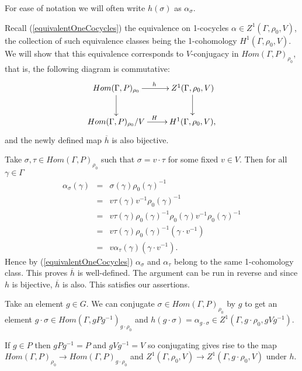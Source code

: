 For ease of notation we will often write $h(\sigma)$ as $\alpha_\sigma$.

Recall (\ref{equivalentOneCocycles}) the equivalence on 1-cocycles $\alpha\in Z^1(\Gamma, \rho_0, V)$, the collection of such equivalence classes being the 1-cohomology $H^1(\Gamma, \rho_0, V)$. We will show that this equivalence corresponds to $V$-conjugacy in $Hom(\Gamma, P)_{\rho_0}$, that is, the following diagram is commutative:
\begin{displaymath}
	\xymatrix{
		Hom(\Gamma, P)_{\rho_0} \ar[r]^h \ar[d] & Z^1(\Gamma, \rho_0, V)\ar[d] \\
		Hom(\Gamma, P)_{\rho_0}/V \ar[r]^{H} & H^1(\Gamma, \rho_0, V),
	}
\end{displaymath}
and the newly defined map $\overline{h}$ is also bijective.

Take $\sigma,\tau\in Hom(\Gamma, P)_{\rho_0}$ such that $\sigma = v\cdot\tau$ for some fixed $v\in V$. Then for all $\gamma\in \Gamma$
\begin{eqnarray*}
	\alpha_\sigma(\gamma) &=& \sigma(\gamma)\rho_0(\gamma)^{-1}\\
	&=& v\tau(\gamma)v^{-1}\rho_0(\gamma)^{-1}\\
	&=& v\tau(\gamma)\rho_0(\gamma)^{-1}\rho_0(\gamma)v^{-1}\rho_0(\gamma)^{-1}\\
	&=& v\tau(\gamma)\rho_0(\gamma)^{-1}(\gamma\cdot v^{-1})\\
	&=& v\alpha_\tau(\gamma)(\gamma\cdot v^{-1}).
\end{eqnarray*}
Hence by (\ref{equivalentOneCocycles}) $\alpha_\sigma$ and $\alpha_\tau$ belong to the same 1-cohomology class. This proves $\overline{h}$ is well-defined. The argument can be run in reverse and since $h$ is bijective, $\overline{h}$ is also. This satisfies our assertions.

Take an element $g\in G$. We can conjugate $\sigma\in Hom(\Gamma, P)_{\rho_0}$ by $g$ to get an element $g\cdot\sigma\in Hom(\Gamma, gPg^{-1})_{g\cdot\rho_0}$ and $h(g\cdot\sigma) = \alpha_{g\cdot\sigma}\in Z^1(\Gamma, g\cdot\rho_0, gVg^{-1})$.

If $g\in P$ then $gPg^{-1} = P$ and $gVg^{-1} = V$ so conjugating gives rise to the map $Hom(\Gamma, P)_{\rho_0}\rightarrow Hom(\Gamma, P)_{g\cdot\rho_0}$ and $Z^1(\Gamma, \rho_0, V)\rightarrow Z^1(\Gamma, g\cdot\rho_0, V)$ under $h$. 

